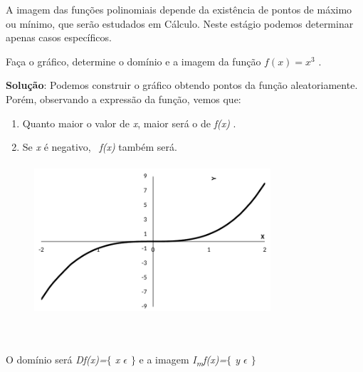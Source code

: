 \begin{justify}
\quad A imagem das funções polinomiais depende da existência de pontos de máximo ou mínimo, que serão estudados em Cálculo. Neste estágio podemos determinar apenas casos específicos.
\end{justify}

\begin{texemplo}
	
Faça o gráfico, determine o domínio e a imagem da função  \( f \left( x \right) =x^{3} \) .

\begin{justify}
\textbf{Solução}: Podemos construir o gráfico obtendo pontos da função aleatoriamente. Porém, observando a expressão da função, vemos que: 
\end{justify}

\begin{enumerate}[label=(\roman*)]
    \item Quanto maior o valor de \textit{x}, maior será o de \textit{f(x) }.

	\item Se \textit{x} é negativo,~ \textit{f(x) }também será.
\end{enumerate}
\begin{figure}[H]
	\begin{Center}
		\includegraphics[width=3.46in,height=2.22in]{capitulos/outras_funcoes/media/image16.pdf}
	\end{Center}
\end{figure}

~~

\begin{justify}
O domínio será \textit{Df(x)=$ \{ $ x $ \epsilon $  \textbf{ }$ \} $ } e a imagem  \textit{I\textsubscript{m}f(x)=$ \{ $ y $ \epsilon $ \textbf{ }$ \} $ } \qedsymbol{}
\end{justify}
\end{texemplo}

